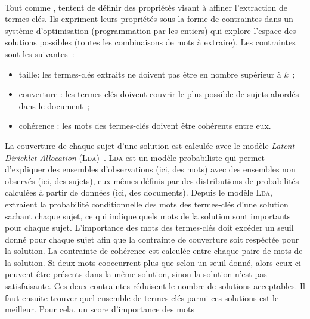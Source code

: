         \label{subsubsec:main-state_of_the_art-automatic_keyphrase_extraction-unsupervised_keyphrase_extraction-statistical_approaches:ilp}
        ~\\Tout comme ,
         tentent de définir des
        propriétés visant à affiner l'extraction de termes-clés. Ils expriment leurs propriétés sous
        la forme de contraintes dans un système d'optimisation (programmation
        par les entiers) qui explore l'espace des solutions possibles (toutes
        les combinaisons de mots à extraire). Les contraintes sont les
        suivantes~:
        \begin{itemize}
          \item{taille: les termes-clés extraits ne doivent pas être en nombre
                supérieur à $k$~;}
          \item{couverture : les termes-clés doivent couvrir le plus possible de
                sujets abordés dans le document~;}
          \item{cohérence : les mots des termes-clés doivent être cohérents
                entre eux.}
        \end{itemize}
        La couverture de chaque sujet d'une solution est calculée avec le modèle
        \textit{Latent Dirichlet Allocation} (\textsc{Lda})~\cite{blei2003lda}.
        \textsc{Lda} est un modèle probabiliste qui permet d'expliquer des
        ensembles d'observations (ici, des mots) avec des ensembles non observés
        (ici, des sujets), eux-mêmes définis par des distributions de
        probabilités calculées à partir de données (ici, des documents). Depuis
        le modèle \textsc{Lda}, 
        extraient la probabilité conditionnelle des mots des termes-clés d'une
        solution sachant chaque sujet, ce qui indique quels mots de la solution
        sont importants pour chaque sujet. L'importance des mots des termes-clés
        doit excéder un seuil donné pour chaque sujet afin que la contrainte de
        couverture soit respéctée pour la solution. La contrainte de cohérence
        est calculée entre chaque paire de mots de la solution. Si deux mots
        cooccurrent plus que selon un seuil donné, alors ceux-ci peuvent être
        présents dans la même solution, sinon la solution n'est pas
        satisfaisante. Ces deux contraintes réduisent le nombre de solutions
        acceptables. Il faut ensuite trouver quel ensemble de termes-clés parmi
        ces solutions est le meilleur. Pour cela, un score d'importance des mots
